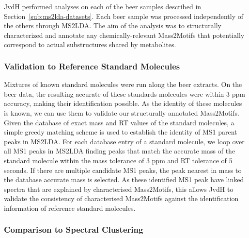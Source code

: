 JvdH performed analyses on each of the beer samples described in Section~\ref{sub:ms2lda-datasets}. Each beer sample was processed independently of the others through MS2LDA. The aim of the analysis was to structurally characterized and annotate any chemically-relevant Mass2Motifs that potentially correspond to actual substructures shared by metabolites. 

\subsubsection{Validation to Reference Standard Molecules}

Mixtures of known standard molecules were run along the beer extracts. On the beer data, the resulting accurate of these standards molecules were within 3 ppm accuracy, making their identification possible. As the identity of these molecules is known, we can use them to validate our structurally annotated Mass2Motifs. Given the database of exact mass and RT values of the standard molecules, a simple greedy matching scheme is used to establish the identity of MS1 parent peaks in MS2LDA. For each database entry of a standard molecule, we loop over all MS1 peaks in MS2LDA finding peaks that match the accurate mass of the standard molecule within the mass tolerance of 3 ppm and RT tolerance of 5 seconds. If there are multiple candidate MS1 peaks, the peak nearest in mass to the database accurate mass is selected. As these identified MS1 peak have linked spectra that are explained by characterised Mass2Motifs, this allows JvdH to validate the consistency of characterised Mass2Motifs against the identification information of reference standard molecules.

\subsubsection{Comparison to Spectral Clustering}

